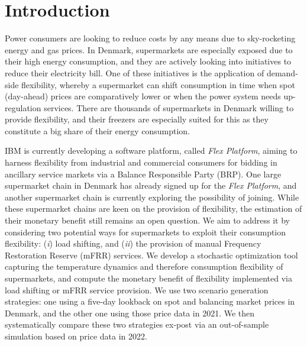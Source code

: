 \vspace{-0.2cm}
\section{Introduction}

Power consumers are looking to reduce costs by any means due to sky-rocketing energy and gas prices. In Denmark, supermarkets are especially exposed due to their high energy consumption, and they are actively looking into initiatives to reduce their electricity bill. One of these initiatives is the application of demand-side flexibility, whereby a supermarket can shift consumption in time when spot (day-ahead) prices are comparatively lower or when the power system needs up-regulation services. There are thousands of supermarkets in Denmark willing to provide flexibility, and their freezers are especially suited for this as they constitute a big share of their energy consumption.

IBM is currently developing a software platform, called \textit{Flex Platform}, aiming to harness flexibility from industrial and commercial consumers for bidding in ancillary service markets via a Balance Responsible Party (BRP). One large supermarket chain in Denmark has already signed up for the \textit{Flex Platform}, and another supermarket chain is currently exploring the possibility of joining.
While these supermarket chains are keen on the provision of flexibility, the estimation of their monetary benefit still remains an open question. We aim to address it by considering two potential ways for supermarkets to exploit their consumption flexibility: (\textit{i}) load shifting, and (\textit{ii}) the provision of manual Frequency Restoration Reserve (mFRR)
services. We  develop  a stochastic optimization tool capturing the temperature dynamics and therefore consumption flexibility of supermarkets, and compute the monetary benefit of flexibility implemented via load shifting or mFRR service provision. We use two scenario generation  strategies: one using a five-day lookback on spot and balancing market prices in Denmark, and the other one using those price data in 2021. We then systematically compare these two strategies ex-post via an out-of-sample simulation based on price data in 2022.


